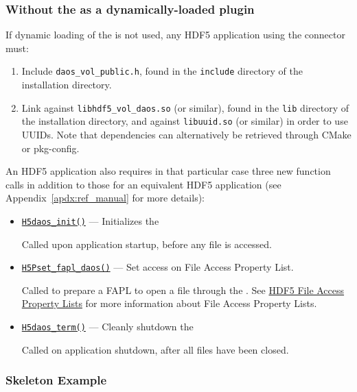 \documentclass[../users_guide.tex]{subfiles}
\begin{document}
\subsubsection{Without the \dvc{} as a dynamically-loaded plugin}

If dynamic loading of the \dvc{} is not used, any HDF5 application
using the connector must:
\begin{enumerate}
 \item Include \texttt{daos\_vol\_public.h}, found in the \texttt{include}
directory of the \dvc{} installation directory.
 \item Link against \texttt{libhdf5\_vol\_daos.so} (or similar), found in
the \texttt{lib} directory of the \dvc{} installation directory, and
against \texttt{libuuid.so} (or similar) in order to use UUIDs. Note that dependencies
can alternatively be retrieved through CMake or pkg-config.
\end{enumerate}

An HDF5 \dvc{} application also requires in that particular case three new
function calls in addition to those for an equivalent HDF5 application (see
Appendix~\ref{apdx:ref_manual} for more details):

\begin{itemize}
 \item \texttt{\hyperref[ref:h5daos_init]{H5daos\_init()}} --- Initializes the \dvc{}

    Called upon application startup, before any file is accessed.

 \item \texttt{\hyperref[ref:h5pset_fapl_daos]{H5Pset\_fapl\_daos()}} --- Set \dvc{} access on File Access Property List.

    Called to prepare a FAPL to open a file through the \dvc{}. See \href{https://support.hdfgroup.org/HDF5/Tutor/property.html#fa}{HDF5 File Access Property Lists} for more information about File Access Property Lists.

 \item \texttt{\hyperref[ref:h5daos_term]{H5daos\_term()}} --- Cleanly shutdown the \dvc{}

    Called on application shutdown, after all files have been closed.
\end{itemize}

\subsubsection{Skeleton Example}
\end{document}
